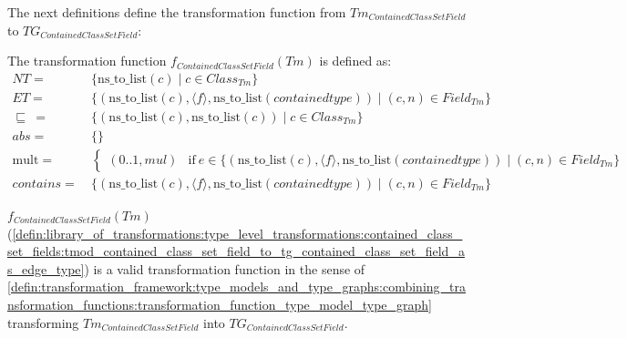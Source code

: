 The next definitions define the transformation function from $Tm_{ContainedClassSetField}$ to $TG_{ContainedClassSetField}$:

\begin{defin}
\label{defin:library_of_transformations:type_level_transformations:contained_class_set_fields:tmod_contained_class_set_field_to_tg_contained_class_set_field_as_edge_type}
The transformation function $f_{ContainedClassSetField}(Tm)$ is defined as:
\begin{align*}
NT =\ &\{\mathrm{ns\_\!to\_\!list}(c) \mid c \in Class_{Tm}\}\\
ET =\ &\{(\mathrm{ns\_\!to\_\!list}(c), \langle f \rangle, \mathrm{ns\_\!to\_\!list}(containedtype)) \mid (c, n) \in Field_{Tm} \} \\
\!\!\sqsubseteq\ =\ &\{( \mathrm{ns\_\!to\_\!list}(c), \mathrm{ns\_\!to\_\!list}(c) ) \mid c \in Class_{Tm} \} \\
abs =\ &\{\} \\
\mathrm{mult} =\ &\begin{cases}
    (0..1, mul) &\mathrm{if}\ e \in \{(\mathrm{ns\_\!to\_\!list}(c), \langle f \rangle, \mathrm{ns\_\!to\_\!list}(containedtype)) \mid (c, n) \in Field_{Tm} \}
\end{cases} \\
contains =\ &\{(\mathrm{ns\_\!to\_\!list}(c), \langle f \rangle, \mathrm{ns\_\!to\_\!list}(containedtype)) \mid (c, n) \in Field_{Tm} \}
\end{align*}
\end{defin}

\begin{thm}
\label{defin:library_of_transformations:type_level_transformations:contained_class_set_fields:tmod_contained_class_set_field_to_tg_contained_class_set_field_as_edge_type_func}
$f_{ContainedClassSetField}(Tm)$ (\cref{defin:library_of_transformations:type_level_transformations:contained_class_set_fields:tmod_contained_class_set_field_to_tg_contained_class_set_field_as_edge_type}) is a valid transformation function in the sense of \cref{defin:transformation_framework:type_models_and_type_graphs:combining_transformation_functions:transformation_function_type_model_type_graph} transforming $Tm_{ContainedClassSetField}$ into $TG_{ContainedClassSetField}$.
\end{thm}

